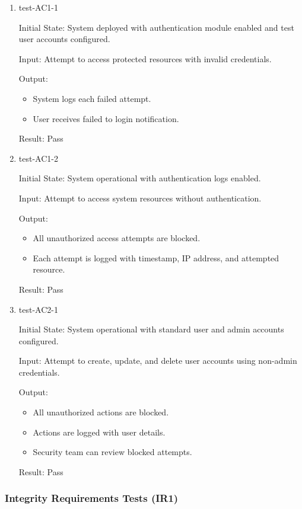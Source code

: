 \documentclass[12pt, titlepage]{article}
\begin{document}
\begin{enumerate}
\item test-AC1-1 \label{test-AC1-1}

Initial State: System deployed with authentication module enabled and test user accounts configured.

Input: Attempt to access protected resources with invalid credentials.

Output:
\begin{itemize}
\item System logs each failed attempt.
\item User receives failed to login notification.
\end{itemize}

Result: Pass

\item test-AC1-2 \label{test-AC1-2}

Initial State: System operational with authentication logs enabled.

Input: Attempt to access system resources without authentication.

Output: 
\begin{itemize}
    \item All unauthorized access attempts are blocked.
    \item Each attempt is logged with timestamp, IP address, and attempted resource.
\end{itemize}

Result: Pass

\item test-AC2-1 \label{test-AC2-1}

Initial State: System operational with standard user and admin accounts configured.

Input: Attempt to create, update, and delete user accounts using non-admin credentials.

Output:
\begin{itemize}
\item All unauthorized actions are blocked.
\item Actions are logged with user details.
\item Security team can review blocked attempts.
\end{itemize}

Result: Pass

\end{enumerate}

\subsubsection{Integrity Requirements Tests (IR1)} \label{section:4.10.2}
\end{document}
